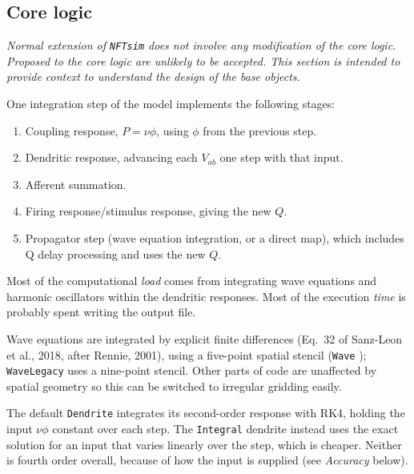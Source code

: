 \documentclass[12pt,a4paper]{article}
\newcommand{\type}[1]{{\small\small\tt #1} }
\newcommand{\NF}[0]{\type{NFTsim}}
\begin{document}
\subsection{Core logic}

{\em Normal extension of \NF does not involve any modification of the core logic. Proposed to the core logic are unlikely to be accepted. This section is intended to provide context to understand the design of the base objects.}

One integration step of the model implements the following stages:

\begin{enumerate}
    \item  Coupling response, \(P = \nu\phi\), using \(\phi\) from the previous step.
    \item  Dendritic response, advancing each \(V_{ab}\) one step with that input.
    \item  Afferent summation.
    \item  Firing response/stimulus response, giving the new \(Q\).
    \item  Propagator step (wave equation integration, or a direct map), which includes Q delay processing and uses the new \(Q\).
\end{enumerate}

Most of the computational {\em load} comes from integrating wave equations and harmonic oscillators within the dendritic responses. Most of the execution {\em time} is probably spent writing the output file.

Wave equations are integrated by explicit finite differences (Eq.~32 of Sanz-Leon et al., 2018, after Rennie, 2001), using a five-point spatial stencil (\type{Wave}); \type{WaveLegacy} uses a nine-point stencil. Other parts of code are unaffected by spatial geometry so this can be switched to irregular gridding easily.

The default \type{Dendrite} integrates its second-order response with RK4, holding the input \(\nu\phi\) constant over each step. The \type{Integral} dendrite instead uses the exact solution for an input that varies linearly over the step, which is cheaper. Neither is fourth order overall, because of how the input is supplied (see \emph{Accuracy} below).
\end{document}
